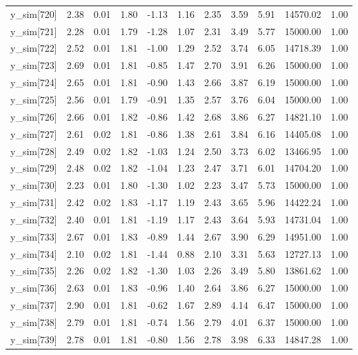 \begin{table}[ht]
\begin{tabular}{rrrrrrrrrrr}
  y\_sim[720] & 2.38 & 0.01 & 1.80 & -1.13 & 1.16 & 2.35 & 3.59 & 5.91 & 14570.02 & 1.00 \\ 
  y\_sim[721] & 2.28 & 0.01 & 1.79 & -1.28 & 1.07 & 2.31 & 3.49 & 5.77 & 15000.00 & 1.00 \\ 
  y\_sim[722] & 2.52 & 0.01 & 1.81 & -1.00 & 1.29 & 2.52 & 3.74 & 6.05 & 14718.39 & 1.00 \\ 
  y\_sim[723] & 2.69 & 0.01 & 1.81 & -0.85 & 1.47 & 2.70 & 3.91 & 6.26 & 15000.00 & 1.00 \\ 
  y\_sim[724] & 2.65 & 0.01 & 1.81 & -0.90 & 1.43 & 2.66 & 3.87 & 6.19 & 15000.00 & 1.00 \\ 
  y\_sim[725] & 2.56 & 0.01 & 1.79 & -0.91 & 1.35 & 2.57 & 3.76 & 6.04 & 15000.00 & 1.00 \\ 
  y\_sim[726] & 2.66 & 0.01 & 1.82 & -0.86 & 1.42 & 2.68 & 3.86 & 6.27 & 14821.10 & 1.00 \\ 
  y\_sim[727] & 2.61 & 0.02 & 1.81 & -0.86 & 1.38 & 2.61 & 3.84 & 6.16 & 14405.08 & 1.00 \\ 
  y\_sim[728] & 2.49 & 0.02 & 1.82 & -1.03 & 1.24 & 2.50 & 3.73 & 6.02 & 13466.95 & 1.00 \\ 
  y\_sim[729] & 2.48 & 0.02 & 1.82 & -1.04 & 1.23 & 2.47 & 3.71 & 6.01 & 14704.20 & 1.00 \\ 
  y\_sim[730] & 2.23 & 0.01 & 1.80 & -1.30 & 1.02 & 2.23 & 3.47 & 5.73 & 15000.00 & 1.00 \\ 
  y\_sim[731] & 2.42 & 0.02 & 1.83 & -1.17 & 1.19 & 2.43 & 3.65 & 5.96 & 14422.24 & 1.00 \\ 
  y\_sim[732] & 2.40 & 0.01 & 1.81 & -1.19 & 1.17 & 2.43 & 3.64 & 5.93 & 14731.04 & 1.00 \\ 
  y\_sim[733] & 2.67 & 0.01 & 1.83 & -0.89 & 1.44 & 2.67 & 3.90 & 6.29 & 14951.00 & 1.00 \\ 
  y\_sim[734] & 2.10 & 0.02 & 1.81 & -1.44 & 0.88 & 2.10 & 3.31 & 5.63 & 12727.13 & 1.00 \\ 
  y\_sim[735] & 2.26 & 0.02 & 1.82 & -1.30 & 1.03 & 2.26 & 3.49 & 5.80 & 13861.62 & 1.00 \\ 
  y\_sim[736] & 2.63 & 0.01 & 1.83 & -0.96 & 1.40 & 2.64 & 3.86 & 6.27 & 15000.00 & 1.00 \\ 
  y\_sim[737] & 2.90 & 0.01 & 1.81 & -0.62 & 1.67 & 2.89 & 4.14 & 6.47 & 15000.00 & 1.00 \\ 
  y\_sim[738] & 2.79 & 0.01 & 1.81 & -0.74 & 1.56 & 2.79 & 4.01 & 6.37 & 15000.00 & 1.00 \\ 
  y\_sim[739] & 2.78 & 0.01 & 1.81 & -0.80 & 1.56 & 2.78 & 3.98 & 6.33 & 14847.28 & 1.00 \\ 

\end{tabular}
\end{table}
